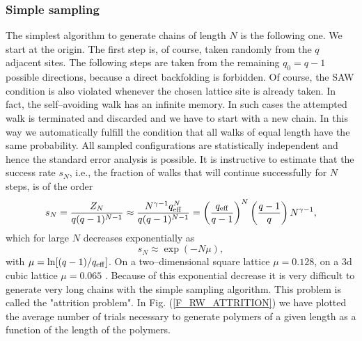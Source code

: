 \subsubsection{Simple sampling}
The simplest algorithm to generate chains of  length $N$ is the 
following one. We start at the origin. The first step is, of 
course,  taken randomly from the $q$ adjacent sites. The following 
steps are taken from the remaining $q_0=q-1$ possible directions, 
because a direct backfolding is forbidden. Of course, the SAW 
condition is also violated whenever the chosen lattice site is 
already taken. In fact, the self--avoiding walk has an infinite
memory. In such cases the attempted walk is terminated and 
discarded and we have to start with a new chain. In this way we 
automatically fulfill the condition that all walks  of equal 
length have the same probability. All sampled configurations are 
statistically independent and hence the standard error analysis 
is possible. It is instructive to estimate that the success rate
$s_N$, i.e., the fraction of walks that will continue successfully 
for $N$ steps, is of the order
\begin{equation*}
s_N = \frac{Z_N}{q(q-1)^{N-1}} \approx
      \frac{N^{\gamma -1} q_{\rm eff}^N}{q(q-1)^{N-1}}
       = \left( \frac{q_{\rm eff}}{q-1}\right)^N 
         \left( \frac{q-1}{q} \right) N^{\gamma -1},
\end{equation*}
which for large $N$ decreases exponentially as
\begin{equation*}
s_N \approx \exp(-N \mu),
\end{equation*}
with $\mu=\ln[(q-1)/q_{\rm eff}]$. 
On a two--dimensional square lattice $\mu = 0.128$, on a 3d cubic lattice
$\mu = 0.065$ \cite{KREMER_AND_BINDER}. Because of this exponential 
decrease it is very  difficult to generate very long chains with 
the simple sampling algorithm. This problem is called the 
"attrition problem". In Fig. (\ref{F_RW_ATTRITION}) we have 
plotted the average number of trials necessary to generate 
polymers of a given length as a function of the length of the
polymers.
